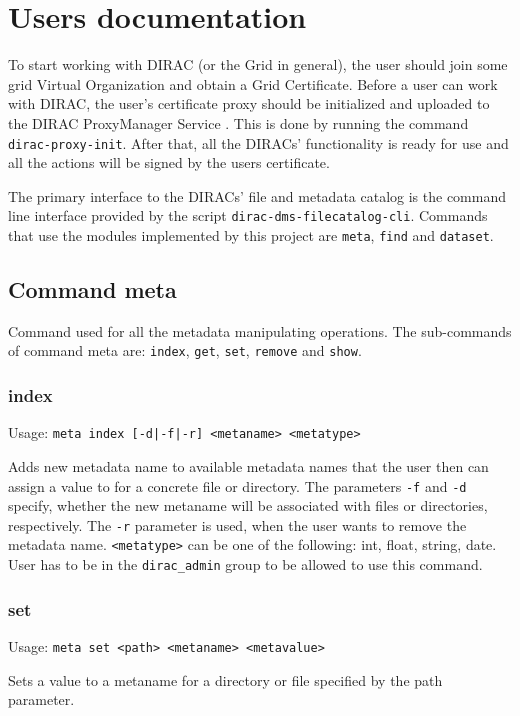 \chapter{Users documentation}
\label{chap:user}

To start working with DIRAC 
(or the Grid in general), the user should join some 
grid Virtual Organization and obtain a Grid Certificate. 
Before a user can work with DIRAC, the user’s certificate proxy 
should be initialized and uploaded to the DIRAC ProxyManager Service \cite{DISET}.
This is done by running the command \texttt{dirac-proxy-init}. After that,
all the DIRACs' functionality is ready for use and all the actions will
be signed by the users certificate.

The primary interface to the DIRACs' file and metadata catalog
is the command line interface provided by the script
\texttt{dirac-dms-filecatalog-cli}. Commands that use the modules 
implemented by this project are \texttt{meta}, \texttt{find} 
and \texttt{dataset}.

\section{Command meta}
Command used for all the metadata manipulating operations.
The sub-commands of command meta are: \texttt{index}, \texttt{get},
\texttt{set}, \texttt{remove} and \texttt{show}.

\subsection{index}
Usage: \texttt{meta index [-d|-f|-r] <metaname> <metatype>}

Adds new metadata name to available metadata names
that the user then can assign a value to for a concrete file
or directory. The parameters \texttt{-f} and \texttt{-d} specify,
whether the new metaname will be associated with files or directories,
respectively. The \texttt{-r} parameter is used, when the user
wants to remove the metadata name. \texttt{<metatype>} can be
one of the following: int, float, string, date. User has to be
in the \texttt{dirac\_admin} group to be allowed to use this
command.

\subsection{set}
Usage: \texttt{meta set <path> <metaname> <metavalue>}

Sets a value to a metaname for a directory or file specified by
the path parameter. 


